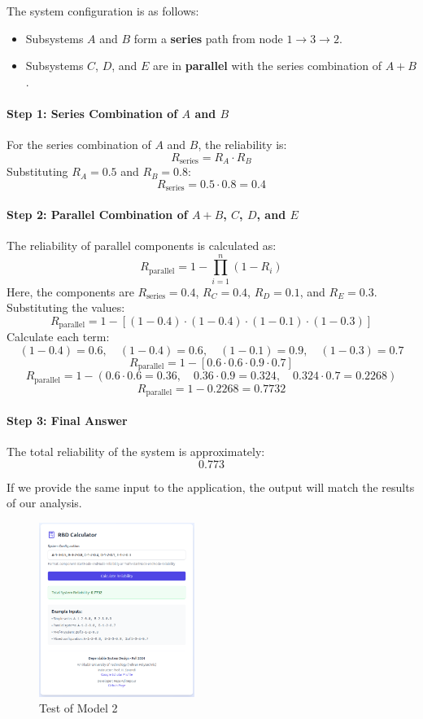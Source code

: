 \documentclass[12pt	]{article}
\begin{document}
The system configuration is as follows:
\begin{itemize}
	\item Subsystems $A$ and $B$ form a \textbf{series} path from node $1 \to 3 \to 2$.
	\item Subsystems $C$, $D$, and $E$ are in \textbf{parallel} with the series combination of $A+B$.
\end{itemize}

\paragraph{Step 1: Series Combination of $A$ and $B$}
For the series combination of $A$ and $B$, the reliability is:
\[
R_{\text{series}} = R_A \cdot R_B
\]
Substituting $R_A = 0.5$ and $R_B = 0.8$:
\[
R_{\text{series}} = 0.5 \cdot 0.8 = 0.4
\]

\paragraph{Step 2: Parallel Combination of $A+B$, $C$, $D$, and $E$}
The reliability of parallel components is calculated as:
\[
R_{\text{parallel}} = 1 - \prod_{i=1}^n \left(1 - R_i\right)
\]
Here, the components are $R_{\text{series}} = 0.4$, $R_C = 0.4$, $R_D = 0.1$, and $R_E = 0.3$. Substituting the values:
\[
R_{\text{parallel}} = 1 - \left[(1 - 0.4) \cdot (1 - 0.4) \cdot (1 - 0.1) \cdot (1 - 0.3)\right]
\]
Calculate each term:
\[
(1 - 0.4) = 0.6, \quad (1 - 0.4) = 0.6, \quad (1 - 0.1) = 0.9, \quad (1 - 0.3) = 0.7
\]
\[
R_{\text{parallel}} = 1 - \left[0.6 \cdot 0.6 \cdot 0.9 \cdot 0.7\right]
\]
\[
R_{\text{parallel}} = 1 - (0.6 \cdot 0.6 = 0.36, \quad 0.36 \cdot 0.9 = 0.324, \quad 0.324 \cdot 0.7 = 0.2268)
\]
\[
R_{\text{parallel}} = 1 - 0.2268 = 0.7732
\]

\paragraph{Step 3: Final Answer}
The total reliability of the system is approximately:
\[
\boxed{0.773}
\]


If we provide the same input to the application, the output will match the results of our analysis.

\newpage

\begin{figure}[h]
	\centering
	\includegraphics[width=0.45\textwidth]{Images/img4.png}
	\caption{Test of Model 2}
	\label{fig:Test of Model 2}
\end{figure}
\end{document}

